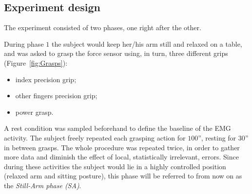 \documentclass[10pt]{bmc_article}
\newenvironment{bmcformat}{\begin{raggedright}\baselineskip20pt\sloppy\setboolean{publ}{false}}{\end{raggedright}\baselineskip20pt\sloppy}
\begin{document}
\begin{bmcformat}

\subsection*{Experiment design}

The experiment consisted of two phases, one right after the
other.

During phase $1$ the subject would keep her/his arm still and relaxed
on a table, and was asked to grasp the force sensor using, in turn,
three different grips (Figure~\ref{fig:Grasps}):

\begin{itemize}
  \item index precision grip;
  \item other fingers precision grip;
  \item power grasp.
\end{itemize}


A rest condition was sampled beforehand to define the baseline of the
EMG activity. The subject freely repeated each grasping action for
$100$'', resting for $30$'' in between grasps. The whole procedure was
repeated twice, in order to gather more data and diminish the effect
of local, statistically irrelevant, errors. Since during these
activities the subject would lie in a highly controlled position
(relaxed arm and sitting posture), this phase will
be referred to from now on as the \emph{Still-Arm phase (SA)}.


\end{bmcformat}
\end{document}
